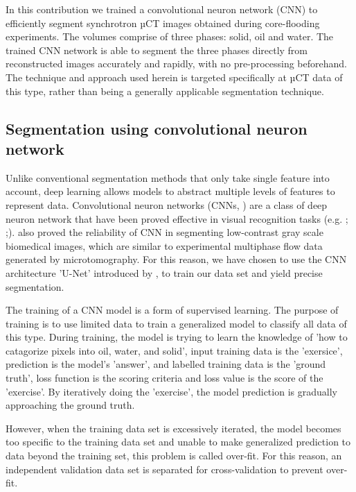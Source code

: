 \documentclass[draft,linenumbers]{agujournal2018}
\begin{document}
In this contribution we trained a convolutional neuron network (CNN) to efficiently segment synchrotron µCT images obtained during core-flooding experiments. The volumes comprise of three phases: solid, oil and water. The trained CNN network is able to segment the three phases directly from reconstructed images accurately and rapidly, with no pre-processing beforehand. The technique and approach used herein is targeted specifically at µCT data of this type, rather than being a generally applicable segmentation technique.

\subsection{Segmentation using convolutional neuron network}
Unlike conventional segmentation methods that only take single feature into account, deep learning allows models to abstract multiple levels of features to represent data. Convolutional neuron networks (CNNs, \citet{lecun2015deep}) are a class of deep neuron network that have been proved effective in visual recognition tasks (e.g. \citet{krizhevsky2012imagenet}; \citet{long2015fully};\citet{girshick2014rich}). \citet{ronneberger2015u} also proved the reliability of CNN in segmenting low-contrast gray scale biomedical images, which are similar to experimental multiphase flow data generated by microtomography. For this reason, we have chosen to use the CNN architecture 'U-Net' introduced by \citet{ronneberger2015u}, to train our data set and yield precise segmentation.

The training of a CNN model is a form of supervised learning. The purpose of training is to use limited data to train a generalized model to classify all data of this type. During training, the model is trying to learn the knowledge of 'how to catagorize pixels into oil, water, and solid', input training data is the 'exersice', prediction is the model's 'answer', and labelled training data is the 'ground truth', loss function is the scoring criteria and loss value is the score of the 'exercise'. By iteratively doing the 'exercise', the model prediction is gradually approaching the ground truth.

However, when the training data set is excessively iterated, the model becomes too specific to the training data set and unable to make generalized prediction to data beyond the training set, this problem is called over-fit. For this reason, an independent validation data set is separated for cross-validation to prevent over-fit.
\end{document}
